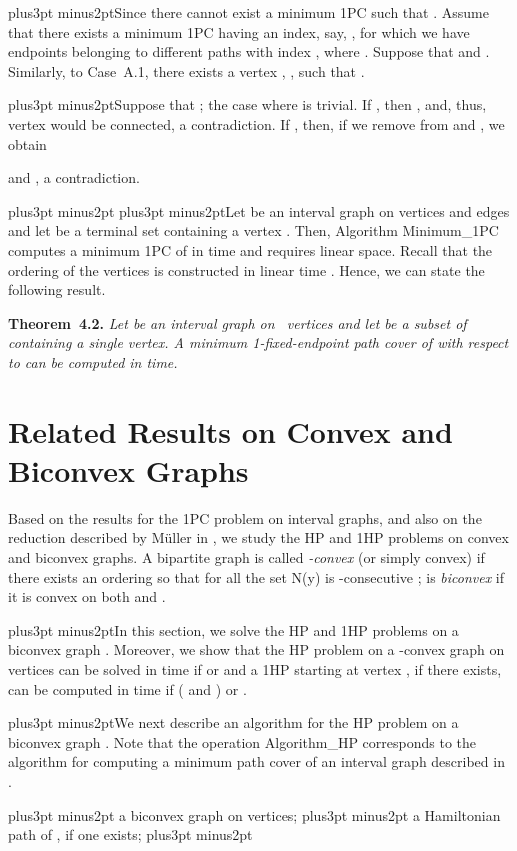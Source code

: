 \documentclass[10pt]{article}
\def\yskip{\penalty-50\vskip3pt plus3pt minus2pt}
\def\y{\yskip}
\def\yy{\yskip\yskip}
\def\qed{\hskip 3pt\vrule height 6pt width 3pt depth 0pt}
\def\s{\ }
\begin{document}
{\y Since  there cannot exist a minimum 1PC
 such that .
Assume that there exists a minimum 1PC
 having an index, say, , for
which we have  endpoints 
belonging to different paths with index ,
where . Suppose
that  and . Similarly, to Case~A.1, there exists a vertex , , such that .

\y Suppose that ; the case where  is
trivial. If , then , and,
thus, vertex  would be connected, a contradiction. If
, then, if we remove  from
 and
, we obtain

and , a
contradiction. \s \qed

\yy Let  be an interval graph on  vertices and 
edges and let  be a terminal set containing a vertex
. Then, Algorithm Minimum\_1PC computes a minimum 1PC
 of  in  time and requires
linear space. Recall that the ordering  of the vertices is
constructed in linear time \cite{RamRan}. Hence, we can state the
following result.

\bigskip
\par\noindent
{\bf Theorem~4.2.} {\it Let  be an interval graph on
~vertices and let  be a subset of 
containing a single vertex. A minimum 1-fixed-endpoint path cover
of  with respect to  can be computed in 
time.}


\vskip 0.3in \section{Related Results on Convex and Biconvex Graphs}
Based on the results for the 1PC problem on interval graphs, and
also on the reduction described by M\"{u}ller in \cite{Muller}, we
study the HP and 1HP problems on convex and biconvex graphs. A
bipartite graph  is called {\it -convex} (or simply
convex) if there exists an ordering  so that for all 
the set N(y) is -consecutive \cite{Muller};  is {\it
biconvex} if it is convex on both  and .

\y In this section, we solve the HP and 1HP problems on a biconvex
graph . Moreover, we show that the HP problem on a
-convex graph  on  vertices can be solved in
 time if  or  and a 1HP starting at
vertex , if there exists, can be computed in  time if
( and ) or .

\y  We next describe an algorithm for the HP problem on a biconvex
graph . Note that the operation Algorithm\_HP
corresponds to the algorithm for computing a minimum path cover of
an interval graph described in \cite{AR90}.


\bigskip {} \y {} a biconvex graph  on  vertices; \y
{} a Hamiltonian path of , if one exists;
\y

}
\end{document}
